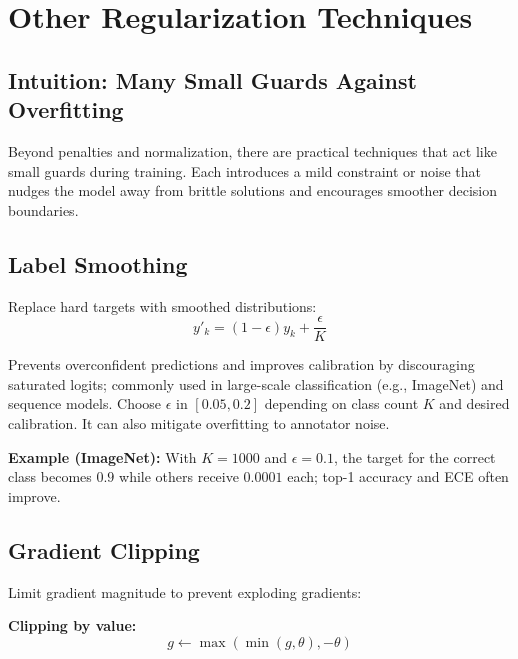 
\section{Other Regularization Techniques}
\label{sec:other-regularization}

\subsection{Intuition: Many Small Guards Against Overfitting}

Beyond penalties and normalization, there are practical techniques that act like small guards during training. Each introduces a mild constraint or noise that nudges the model away from brittle solutions and encourages smoother decision boundaries.

\subsection{Label Smoothing}

Replace hard targets with smoothed distributions:
\begin{equation}
y'_k = (1 - \epsilon) y_k + \frac{\epsilon}{K}
\end{equation}

Prevents overconfident predictions and improves calibration by discouraging saturated logits; commonly used in large-scale classification (e.g., ImageNet) and sequence models. Choose $\epsilon$ in $[0.05, 0.2]$ depending on class count $K$ and desired calibration. It can also mitigate overfitting to annotator noise.

\begin{example}
\textbf{Example (ImageNet):} With $K=1000$ and $\epsilon=0.1$, the target for the correct class becomes $0.9$ while others receive $0.0001$ each; top-1 accuracy and ECE often improve.
\end{example}

\subsection{Gradient Clipping}

Limit gradient magnitude to prevent exploding gradients:

\textbf{Clipping by value:}
\begin{equation}
g \leftarrow \max(\min(g, \theta), -\theta)
\end{equation}

